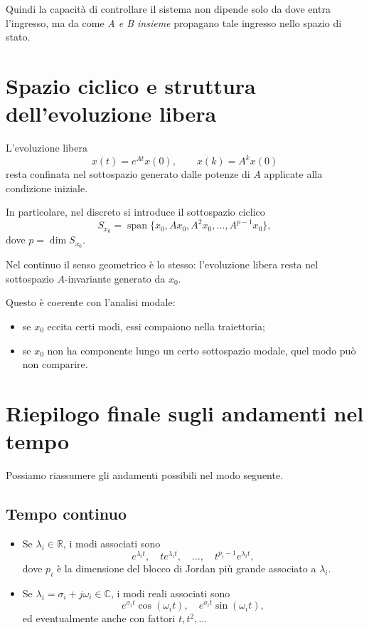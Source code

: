 Quindi la capacità di controllare il sistema non dipende solo da dove entra l'ingresso, ma da come \emph{A e B insieme} propagano tale ingresso nello spazio di stato.

\section{Spazio ciclico e struttura dell'evoluzione libera}

L'evoluzione libera
\[
x(t)=e^{At}x(0),
\qquad
x(k)=A^k x(0)
\]
resta confinata nel sottospazio generato dalle potenze di $A$ applicate alla condizione iniziale.

In particolare, nel discreto si introduce il sottospazio ciclico
\[
S_{x_0}=\operatorname{span}\{x_0,Ax_0,A^2x_0,\dots,A^{p-1}x_0\},
\]
dove $p=\dim S_{x_0}$.

Nel continuo il senso geometrico è lo stesso: l'evoluzione libera resta nel sottospazio $A$-invariante generato da $x_0$.

Questo è coerente con l'analisi modale:
\begin{itemize}
    \item se $x_0$ eccita certi modi, essi compaiono nella traiettoria;
    \item se $x_0$ non ha componente lungo un certo sottospazio modale, quel modo può non comparire.
\end{itemize}

\section{Riepilogo finale sugli andamenti nel tempo}

Possiamo riassumere gli andamenti possibili nel modo seguente.

\subsection*{Tempo continuo}

\begin{itemize}
    \item Se $\lambda_i\in\mathbb{R}$, i modi associati sono
    \[
    e^{\lambda_i t},\quad
    t e^{\lambda_i t},\quad
    \dots,\quad
    t^{p_i-1}e^{\lambda_i t},
    \]
    dove $p_i$ è la dimensione del blocco di Jordan più grande associato a $\lambda_i$.
    \item Se $\lambda_i=\sigma_i+j\omega_i\in\mathbb{C}$, i modi reali associati sono
    \[
    e^{\sigma_i t}\cos(\omega_i t),\quad
    e^{\sigma_i t}\sin(\omega_i t),
    \]
    ed eventualmente anche con fattori $t, t^2,\dots$
\end{itemize}

